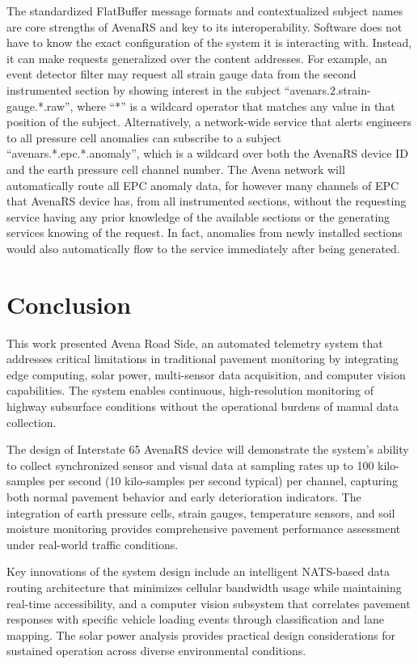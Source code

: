 \documentclass[conference]{IEEEtran}
\begin{document}
The standardized FlatBuffer message formats and contextualized subject names are core strengths of AvenaRS and key to its interoperability.
Software does not have to know the exact configuration of the system it is interacting with.
Instead, it can make requests generalized over the content addresses.
For example, an event detector filter may request all strain gauge data from the second instrumented section by showing interest in the subject ``avenars.2.strain-gauge.*.raw'', where ``*'' is a wildcard operator that matches any value in that position of the subject.
Alternatively, a network-wide service that alerts engineers to all pressure cell anomalies can subscribe to a subject ``avenars.*.epc.*.anomaly'', which is a wildcard over both the AvenaRS device ID and the earth pressure cell channel number.
The Avena network will automatically route all EPC anomaly data, for however many channels of EPC that AvenaRS device has, from all instrumented sections, without the requesting service having any prior knowledge of the available sections or the generating services knowing of the request.
In fact, anomalies from newly installed sections would also automatically flow to the service immediately after being generated.


\section{Conclusion}

This work presented Avena Road Side, an automated telemetry system that addresses critical limitations in traditional pavement monitoring by integrating edge computing, solar power, multi-sensor data acquisition, and computer vision capabilities.
The system enables continuous, high-resolution monitoring of highway subsurface conditions without the operational burdens of manual data collection.

The design of Interstate 65 AvenaRS device will demonstrate the system's ability to collect synchronized sensor and visual data at sampling rates up to 100 kilo-samples per second (10 kilo-samples per second typical) per channel, capturing both normal pavement behavior and early deterioration indicators.
The integration of earth pressure cells, strain gauges, temperature sensors, and soil moisture monitoring provides comprehensive pavement performance assessment under real-world traffic conditions.

Key innovations of the system design include an intelligent NATS-based data routing architecture that minimizes cellular bandwidth usage while maintaining real-time accessibility, and a computer vision subsystem that correlates pavement responses with specific vehicle loading events through classification and lane mapping.
The solar power analysis provides practical design considerations for sustained operation across diverse environmental conditions.
\end{document}
